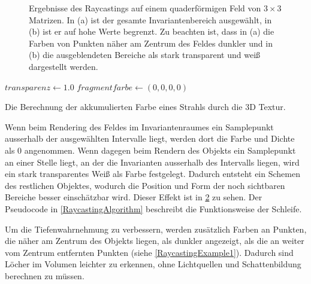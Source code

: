 \documentclass[a4paper,fontsize=12pt,toc=bib,halfparskip,ngerman]{scrartcl}
\begin{document}
\begin{figure}
\begin{subfigure}{0.49\textwidth}
		\subcaption{}
		\label{RaycastingExample2}
	\end{subfigure}
	\hspace*{\fill}
	\caption{Ergebnisse des Raycastings auf einem quaderf\"ormigen Feld von $3\times3$ Matrizen. In (a) ist der gesamte Invariantenbereich ausgew\"ahlt, in (b) ist er auf hohe Werte begrenzt. Zu beachten ist, dass in (a) die Farben von Punkten n\"aher am Zentrum des Feldes dunkler und in (b) die ausgeblendeten Bereiche als stark transparent und wei{\ss} dargestellt werden.}
	\label{RaycastingExample}
\end{figure}

\begin{algorithm}[t]
	$transparenz\gets 1.0$\;
	$fragmentfarbe\gets (0, 0, 0, 0)$\;
	\vspace{0.5cm}
	\caption{Die Berechnung der akkumulierten Farbe eines Strahls durch die 3D Textur.}
	\label{RaycastingAlgorithm}
\end{algorithm}

Wenn beim Rendering des Feldes im Invariantenraumes ein Samplepunkt ausserhalb der ausgew\"ahlten Intervalle liegt, werden dort die Farbe und Dichte als 0 angenommen. Wenn dagegen beim Rendern des Objekts ein Samplepunkt an einer Stelle liegt, an der die Invarianten ausserhalb des Intervalls liegen, wird ein stark transparentes Wei{\ss} als Farbe festgelegt. Dadurch entsteht ein Schemen des restlichen Objektes, wodurch die Position und Form der noch sichtbaren Bereiche besser einsch\"atzbar wird. Dieser Effekt ist in \cref{RaycastingExample} zu sehen. Der Pseudocode in \cref{RaycastingAlgorithm} beschreibt die Funktionsweise der Schleife.

Um die Tiefenwahrnehmung zu verbessern, werden zus\"atzlich Farben an Punkten, die n\"aher am Zentrum des Objekts liegen, als dunkler angezeigt, als die an weiter vom Zentrum entfernten Punkten (siehe \cref{RaycastingExample1}). Dadurch sind L\"ocher im Volumen leichter zu erkennen, ohne Lichtquellen und Schattenbildung berechnen zu m\"ussen.
\end{document}

